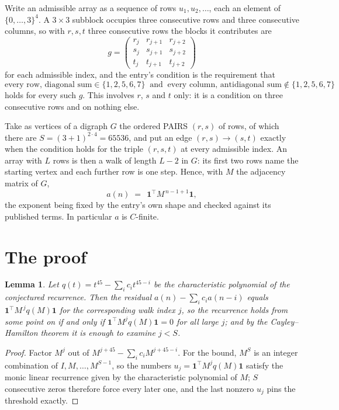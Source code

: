 \documentclass[11pt,a4paper]{article}
\theoremstyle{plain}
\newtheorem{lemma}[theorem]{Lemma}
\theoremstyle{definition}
\begin{document}
Write an admissible array as a sequence of rows $u_1,u_2,\dots$, each an element of
$\{0,\dots,3\}^{4}$. A $3\times3$ subblock occupies three consecutive rows and
three consecutive columns, so with $r,s,t$ three consecutive rows the blocks it
contributes are
\[
g=\begin{pmatrix}r_j&r_{j+1}&r_{j+2}\\ s_j&s_{j+1}&s_{j+2}\\ t_j&t_{j+1}&t_{j+2}\end{pmatrix}
\]
for each admissible index, and the entry's condition is the requirement that
\[
\text{every row, diagonal sum} \in \{1,2,5,6,7\}\ \text{ and }\ \text{every column, antidiagonal sum} \notin \{1,2,5,6,7\}
\]
holds for every such $g$. This involves $r$, $s$ and $t$ only: it is a condition on
three consecutive rows and on nothing else.

Take as vertices of a digraph $G$ the ordered PAIRS $(r,s)$ of rows, of which there are
$S=(3+1)^{2\cdot4}=65536$, and put an edge $(r,s)\to(s,t)$ exactly when the condition
holds for the triple $(r,s,t)$ at every admissible index. An array with $L$ rows is then a
walk of length $L-2$ in $G$: its first two rows name the starting vertex and each further
row is one step. Hence, with $M$ the adjacency matrix of $G$,
\[
a(n)\;=\;\,\mathbf{1}^{\!\top}M^{\,n-1+1}\mathbf{1},
\]
the exponent being fixed by the entry's own shape and checked against its published terms.
In particular $a$ is $C$-finite.

\section{The proof}

\begin{lemma}\label{lem:crit}
Let $q(t)=t^{45}-\sum_i c_it^{45-i}$ be the characteristic polynomial of the
conjectured recurrence. Then the residual $a(n)-\sum_ic_ia(n-i)$ equals
$\mathbf{1}^{\!\top}M^{\,j}q(M)\mathbf{1}$ for the corresponding walk index
$j$, so the recurrence holds from some point on if and only if
$\mathbf{1}^{\!\top}M^{j}q(M)\mathbf{1}=0$ for all large $j$; and by the
Cayley--Hamilton theorem it is enough to examine $j<S$.
\end{lemma}

\begin{proof}
Factor $M^{j}$ out of $M^{j+45}-\sum_ic_iM^{j+45-i}$. For the bound, $M^{S}$
is an integer combination of $I,M,\dots,M^{S-1}$, so the numbers
$u_j=\mathbf{1}^{\!\top}M^{j}q(M)\mathbf{1}$ satisfy the monic linear recurrence given by
the characteristic polynomial of $M$; $S$ consecutive zeros therefore force every later one,
and the last nonzero $u_j$ pins the threshold exactly.
\end{proof}
\end{document}
